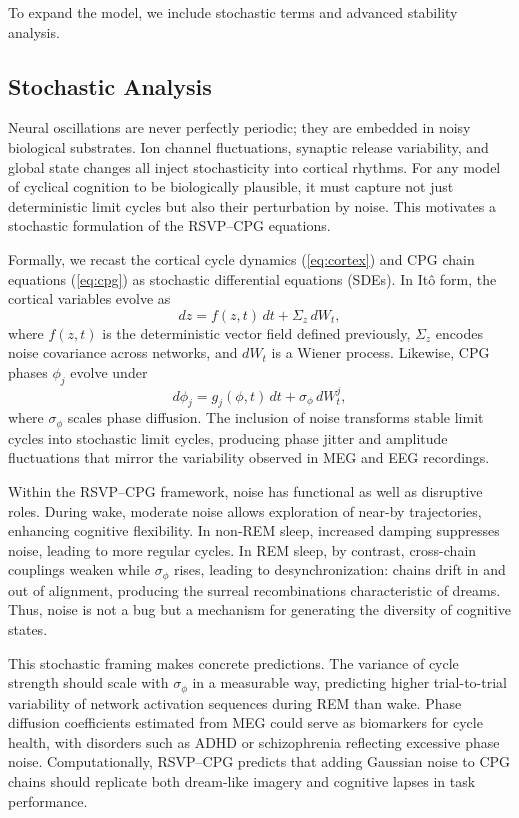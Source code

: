 \documentclass{article}
\begin{document}
To expand the model, we include stochastic terms and advanced stability analysis.
\subsection{Stochastic Analysis}

Neural oscillations are never perfectly periodic; they are embedded in noisy biological substrates. Ion channel fluctuations, synaptic release variability, and global state changes all inject stochasticity into cortical rhythms. For any model of cyclical cognition to be biologically plausible, it must capture not just deterministic limit cycles but also their perturbation by noise. This motivates a stochastic formulation of the RSVP--CPG equations.

Formally, we recast the cortical cycle dynamics (\ref{eq:cortex}) and CPG chain equations (\ref{eq:cpg}) as stochastic differential equations (SDEs). In It\^o form, the cortical variables evolve as
\begin{equation}
dz = f(z,t)\,dt + \Sigma_z\,dW_t,
\end{equation}
where $f(z,t)$ is the deterministic vector field defined previously, $\Sigma_z$ encodes noise covariance across networks, and $dW_t$ is a Wiener process. Likewise, CPG phases $\phi_j$ evolve under
\begin{equation}
d\phi_j = g_j(\phi,t)\,dt + \sigma_\phi\,dW_t^j,
\end{equation}
where $\sigma_\phi$ scales phase diffusion. The inclusion of noise transforms stable limit cycles into stochastic limit cycles, producing phase jitter and amplitude fluctuations that mirror the variability observed in MEG and EEG recordings.

Within the RSVP--CPG framework, noise has functional as well as disruptive roles. During wake, moderate noise allows exploration of near-by trajectories, enhancing cognitive flexibility. In non-REM sleep, increased damping suppresses noise, leading to more regular cycles. In REM sleep, by contrast, cross-chain couplings weaken while $\sigma_\phi$ rises, leading to desynchronization: chains drift in and out of alignment, producing the surreal recombinations characteristic of dreams. Thus, noise is not a bug but a mechanism for generating the diversity of cognitive states.

This stochastic framing makes concrete predictions. The variance of cycle strength should scale with $\sigma_\phi$ in a measurable way, predicting higher trial-to-trial variability of network activation sequences during REM than wake. Phase diffusion coefficients estimated from MEG could serve as biomarkers for cycle health, with disorders such as ADHD or schizophrenia reflecting excessive phase noise. Computationally, RSVP--CPG predicts that adding Gaussian noise to CPG chains should replicate both dream-like imagery and cognitive lapses in task performance.
\end{document}
